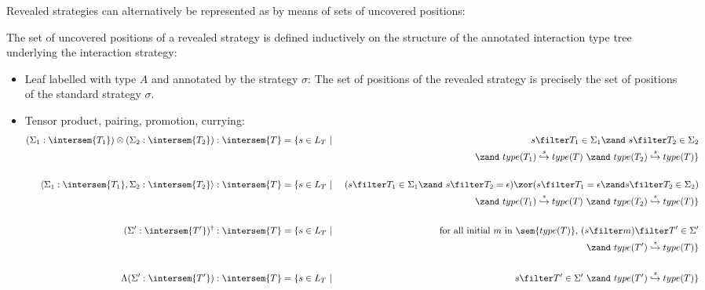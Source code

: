 Revealed strategies can alternatively be represented as by means
of sets of uncovered positions:
\begin{definition}
\label{dfn:revealedstrat}
The set of uncovered positions of a revealed strategy is defined inductively on the
structure of the annotated interaction type tree underlying the
interaction strategy:
\begin{itemize}[-]
\item Leaf labelled with type $A$ and annotated by the strategy $\sigma$: The set of positions of the revealed strategy is precisely the set of positions of the standard strategy $\sigma$.

\item Tensor product, pairing, promotion, currying:
\begin{eqnarray*}
(\Sigma_1 : \intersem{T_1}) \otimes (\Sigma_2 : \intersem{T_2}) : \intersem{T} &=\{ s \in L_T \ | \  &s \filter T_1 \in \Sigma_1 \zand\ s \filter T_2 \in \Sigma_2 \\
&& \zand\ type(T_1)\stackrel{s}\hookrightarrow type(T) \ \zand\ type(T_2)\stackrel{s}\hookrightarrow type(T) \}
\\ \\
\langle \Sigma_1 : \intersem{T_1}, \Sigma_2 : \intersem{T_2} \rangle : \intersem{T} &= \{ s \in L_T \ | &
 ( s \filter T_1 \in \Sigma_1 \zand\ s \filter T_2 = \epsilon)
    \zor ( s \filter T_1 = \epsilon \zand s \filter T_2 \in \Sigma_2) \\
&& \zand\ type(T_1)\stackrel{s}\hookrightarrow type(T) \ \zand\ type(T_2)\stackrel{s}\hookrightarrow type(T) \}
\\ \\
(\Sigma' : \intersem{T'})^\dagger : \intersem{T} &= \{ s \in L_T \ | \ &
\mbox {for all initial $m$ in $\sem{type(T)}$, } (s \filter m) \filter T' \in \Sigma' \\
&& \zand\ type(T')\stackrel{s}\hookrightarrow type(T) \}
\\ \\
\Lambda(\Sigma' : \intersem{T'}) : \intersem{T} &= \{ s \in L_T \ | & s \filter T' \in \Sigma' \ \zand\ type(T')\stackrel{s}\hookrightarrow type(T) \}
\end{eqnarray*}


\end{itemize}
\end{definition}
